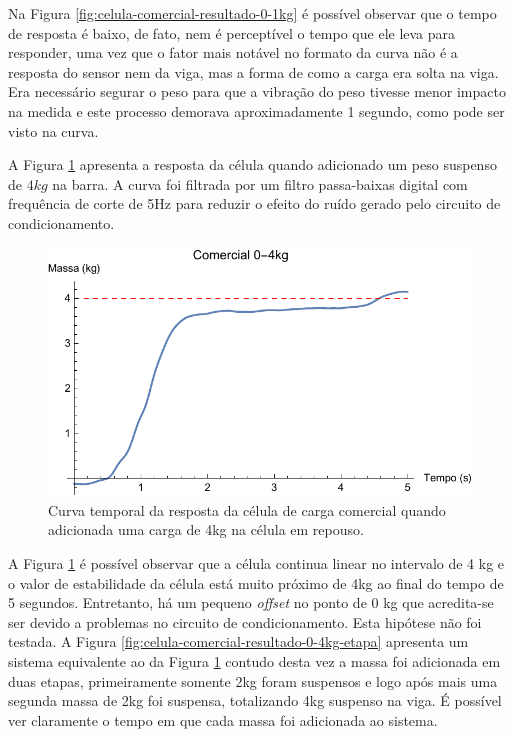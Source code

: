 \documentclass[a4paper]{instrumentacao}
\begin{document}
Na Figura \ref{fig:celula-comercial-resultado-0-1kg} é possível observar que o tempo de resposta é baixo, de fato, nem é perceptível o tempo que ele leva para responder, uma vez que o fator mais notável no formato da curva não é a resposta do sensor nem da viga, mas a forma de como a carga era solta na viga. Era necessário segurar o peso para que a vibração do peso tivesse menor impacto na medida e este processo demorava aproximadamente 1 segundo, como pode ser visto na curva.

A Figura \ref{fig:celula-comercial-resultado-0-4kg} apresenta a resposta da célula quando adicionado um peso suspenso de $4 kg$ na barra. A curva foi filtrada por um filtro passa-baixas digital com frequência de corte de 5Hz para reduzir o efeito do ruído gerado pelo circuito de condicionamento.

\begin{figure}[H]
\center
\includegraphics[width=\textwidth]{Comercial_0-4kg.pdf}
\caption{Curva temporal da resposta da célula de carga comercial quando adicionada uma carga de 4kg na célula em repouso.}
\label{fig:celula-comercial-resultado-0-4kg}
\end{figure}

A Figura \ref{fig:celula-comercial-resultado-0-4kg} é possível observar que a célula continua linear no intervalo de 4 kg e o valor de estabilidade da célula está muito próximo de 4kg ao final do tempo de 5 segundos. Entretanto, há um pequeno \textit{offset} no ponto de 0 kg que acredita-se ser devido a problemas no circuito de condicionamento. Esta hipótese não foi testada. A Figura \ref{fig:celula-comercial-resultado-0-4kg-etapa} apresenta um sistema equivalente ao da Figura \ref{fig:celula-comercial-resultado-0-4kg} contudo desta vez a massa foi adicionada em duas etapas, primeiramente somente 2kg foram suspensos e logo após mais uma segunda massa de 2kg foi suspensa, totalizando 4kg suspenso na viga. É possível ver claramente o tempo em que cada massa foi adicionada ao sistema.
\end{document}
